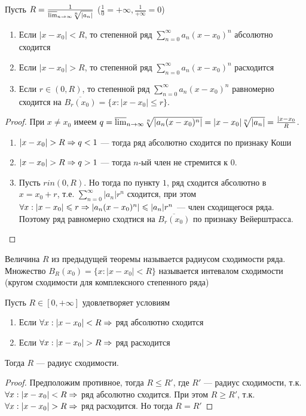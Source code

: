 \begin{theorem}
    Пусть \(R = \frac{1}{\overline{\lim}_{n \rightarrow \infty} \sqrt[n]{|a_n|}}\) (\(\frac{1}{0} = +\infty, \frac{1}{+\infty} = 0\))
    \begin{enumerate}
        \item Если \(|x - x_0| < R\), то степенной ряд \(\sum_{n = 0}^\infty a_n(x - x_0)^n\) абсолютно сходится
        \item Если \(|x - x_0| > R\), то степенной ряд \(\sum_{n = 0}^\infty a_n(x - x_0)^n\) расходится
        \item Если \(r \in (0, R)\), то степенной ряд \(\sum_{n = 0}^\infty a_n(x - x_0)^n\) равномерно сходится на \(\overline{B_r(x_0)} = \{x: |x - x_0| \le r\}\).
    \end{enumerate}
\end{theorem}
\begin{proof}
    При \(x \ne x_0\) имеем \(q = \overline{\lim}_{n \rightarrow \infty} \sqrt[n]{|a_n(x - x_0)^n|} = |x - x_0|\sqrt[n]{|a_n|} = \frac{|x - x_0}{R}\).
    \begin{enumerate}
        \item \(|x - x_0| > R \Rightarrow q < 1\) --- тогда ряд абсолютно сходится по признаку Коши
        \item \(|x - x_0| > R \Rightarrow q > 1\) --- тогда \(n\)-ый член не стремится к \(0\).
        \item Пусть \(r in (0, R)\). Но тогда по пункту \(1\), ряд сходится абсолютно в \(x = x_0 + r\), т.е. \(\sum_{n = 0}^\infty |a_n|r^n\) сходится, при этом \(\forall x: |x - x_0| \leqslant r \Rightarrow |a_n(x - x_0)^n| \leqslant |a_n|r^n\) --- член сходищегося ряда. Поэтому ряд равномерно сходтися на \(\overline{B_r(x_0)}\) по признаку Вейерштрасса.
    \end{enumerate}
\end{proof}

\begin{definition}
    Величина \(R\) из предыдущей теоремы называется радиусом сходимости ряда. Множество \(B_R(x_0) = \{x: |x - x_0| < R\}\) называется интевалом сходимости (кругом сходимости для комплексного степенного ряда)
\end{definition}

\begin{corollary}
    Пусть \(R \in [0, +\infty]\) удовлетворяет условиям
    \begin{enumerate}
        \item Если \(\forall x: |x - x_0| < R \Rightarrow \) ряд абсолютно сходится
        \item Если \(\forall x: |x - x_0| > R \Rightarrow \) ряд расходится
    \end{enumerate}
    Тогда \(R\) --- радиус сходимости.
\end{corollary}
\begin{proof}
    Предположим противное, тогда \(R \le R'\), где \(R'\) --- радиус сходимости, т.к. \(\forall x: |x - x_0| < R \Rightarrow \) ряд абсолютно сходится. При этом \(R \ge R'\), т.к. \(\forall x: |x - x_0| > R \Rightarrow \) ряд расходится. Но тогда \(R = R'\)
\end{proof}

